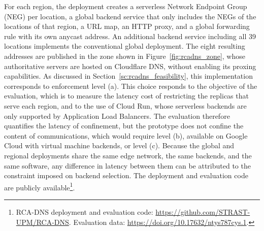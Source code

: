 For each region, the deployment creates a serverless Network Endpoint Group (NEG) per location, a global backend service that only includes the NEGs of the locations of that region, a URL map, an HTTP proxy, and a global forwarding rule with its own anycast address. An additional backend service including all 39 locations implements the conventional global deployment. The eight resulting addresses are published in the zone shown in Figure~\ref{fig:rcadns_zone}, whose authoritative servers are hosted on Cloudflare DNS, without enabling its proxing capabilities. As discussed in Section~\ref{sc:rcadns_feasibility}, this implementation corresponds to enforcement level (a). This choice responds to the objective of the evaluation, which is to measure the latency cost of restricting the replicas that serve each region, and to the use of Cloud Run, whose serverless backends are only supported by Application Load Balancers. The evaluation therefore quantifies the latency of confinement, but the prototype does not confine the content of communications, which would require level (b), available on Google Cloud with virtual machine backends, or level (c). Because the global and regional deployments share the same edge network, the same backends, and the same software, any difference in latency between them can be attributed to the constraint imposed on backend selection. The deployment and evaluation code are publicly available\footnote{RCA-DNS deployment and evaluation code: \url{https://github.com/STRAST-UPM/RCA-DNS}. Evaluation data: \url{https://doi.org/10.17632/ntys787cys.1}.}.

